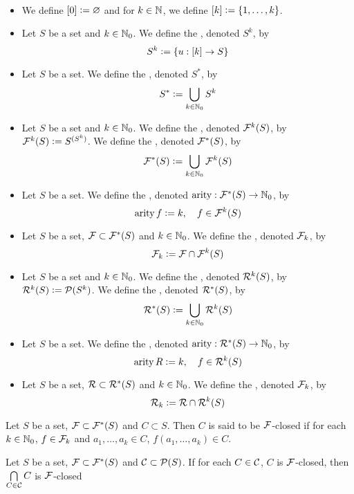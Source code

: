 \documentclass{book}
\begin{document}
	\begin{defn}\
		\begin{itemize}
			\item We define $[0] \vcentcolon= \varnothing$ and for $k \in \mathbb{N}$, we define $[k] \vcentcolon= \{1, \ldots, k\}$. 
			\item Let $S$ be a set and $k \in \mathbb{N}_0$. We define the , denoted $S^k$, by 
			$$S^k \vcentcolon= \{u: [k] \rightarrow S\}$$
			\item Let $S$ be a set. We define the , denoted $S^*$, by 
			$$S^* \vcentcolon= \bigcup_{k \in \mathbb{N}_0} S^k$$
			\item Let $S$ be a set and $k \in \mathbb{N}_0$. We define the , denoted $\mathcal{F}^k(S)$, by $\mathcal{F}^k(S) \vcentcolon= S^{(S^k)}$. We define the , denoted $\mathcal{F}^*(S)$, by
			$$\mathcal{F}^*(S) \vcentcolon= \bigcup_{k \in \mathbb{N}_0} \mathcal{F}^k(S)$$
			\item Let $S$ be a set. We define the , denoted $\operatorname*{\text{arity}}: \mathcal{F}^*(S) \rightarrow \mathbb{N}_0$, by 
			$$\operatorname*{\text{arity}} f \vcentcolon= k, \quad f \in \mathcal{F}^k(S)$$
			\item Let $S$ be a set, $\mathcal{F} \subset \mathcal{F}^*(S)$ and $k \in \mathbb{N}_0$. We define the , denoted $\mathcal{F}_k$, by 
			$$\mathcal{F}_k \vcentcolon= \mathcal{F} \cap \mathcal{F}^k(S)$$
			\item Let $S$ be a set and $k \in \mathbb{N}_0$. We define the , denoted $\mathcal{R}^k(S)$, by $\mathcal{R}^k(S) \vcentcolon= \mathcal{P}(S^k)$. We define the , denoted $\mathcal{R}^*(S)$, by
			$$\mathcal{R}^*(S) \vcentcolon= \bigcup_{k \in \mathbb{N}_0} \mathcal{R}^k(S)$$
			\item Let $S$ be a set. We define the , denoted $\operatorname*{\text{arity}}: \mathcal{R}^*(S) \rightarrow \mathbb{N}_0$, by 
			$$\operatorname*{\text{arity}} R \vcentcolon= k, \quad f \in \mathcal{R}^k(S)$$
			\item Let $S$ be a set, $\mathcal{R} \subset \mathcal{R}^*(S)$ and $k \in \mathbb{N}_0$. We define the , denoted $\mathcal{F}_k$, by 
			$$\mathcal{R}_k \vcentcolon= \mathcal{R} \cap \mathcal{R}^k(S)$$
		\end{itemize}
	\end{defn}
	
	\begin{defn}
		Let $S$ be a set, $\mathcal{F} \subset \mathcal{F}^*(S)$ and $C \subset S$. Then $C$ is said to be  $\mathcal{F}$-closed if for each $k \in \mathbb{N}_0$, $f \in \mathcal{F}_k$ and $a_1, \ldots, a_k \in C$, $f(a_1, \ldots, a_k) \in C$.
	\end{defn}
	
	\begin{ex}
		Let $S$ be a set, $\mathcal{F} \subset \mathcal{F}^*(S)$ and $\mathcal{C} \subset \mathcal{P}(S)$. If for each $C \in \mathcal{C}$, $C$ is  $\mathcal{F}$-closed, then $\bigcap\limits_{C \in \mathcal{C}} C$ is $\mathcal{F}$-closed
	\end{ex}
	
\end{document}
